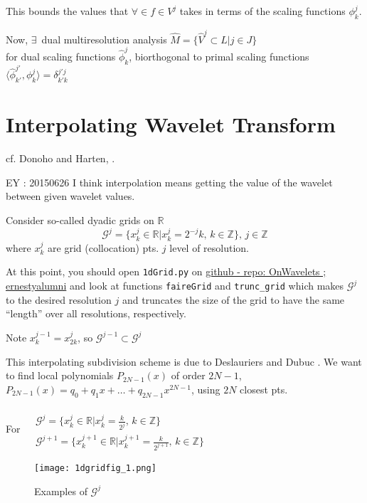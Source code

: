 \documentclass[twoside]{amsart}
\theoremstyle{plain}
\theoremstyle{definition}
\theoremstyle{remark}
\numberwithin{equation}{section}
\begin{document}
This bounds the values that $\forall \in f \in V^j$ takes in terms of the scaling functions $\phi_k^j$.  


Now, $\exists \, $ dual multiresolution analysis $\widehat{M} = \lbrace \widehat{V}^j \subset L | j \in J \rbrace$ \\
\phantom{ dual } for dual scaling functions $\widehat{\phi}^j_k$, biorthogonal to primal scaling functions $\langle \widehat{\phi}_{k'}^{j'} , \phi_k^j \rangle = \delta^{j'j}_{k'k}$  

\section{Interpolating Wavelet Transform}

cf. Donoho and Harten\cite{DDonoho1992}, \cite{AHarten1994}.  

EY : 20150626 I think interpolation means getting the value of the wavelet between given wavelet values.  

Consider so-called dyadic grids on $\mathbb{R}$
\[
\mathcal{G}^j = \lbrace x^j_k \in \mathbb{R} | x^j_k = 2^{-j}k ,\, k \in \mathbb{Z} \rbrace , \, j \in \mathbb{Z}
\]
where $x^j_k$ are grid (collocation) pts. $j$ level of resolution.  

At this point, you should open \verb|1dGrid.py| on \href{https://github.com/ernestyalumni/OnWavelets}{github - repo: OnWavelets ; ernestyalumni} and look at functions \verb|faireGrid| and \verb|trunc_grid| which makes $\mathcal{G}^j$ to the desired resolution $j$ and truncates the size of the grid to have the same ``length'' over all resolutions, respectively.   

Note $x_k^{j-1} = x^j_{2k}$, so $\mathcal{G}^{j-1} \subset \mathcal{G}^j$

This interpolating subdivision scheme is due to Deslauriers and Dubuc \cite{GDeslauriersSDubuc1989}.  
We want to find local polynomials $P_{2N-1}(x)$ of order $2N-1$, $P_{2N-1}(x) = q_0 + q_1 x + \dots + q_{2N-1}x^{2N-1}$, using $2N$ closest pts.  

For $\begin{aligned} & \quad \\ 
  & \mathcal{G}^j = \lbrace x^j_k \in \mathbb{R} | x^j_k = \frac{k}{2^j}, \, k \in \mathbb{Z} \rbrace \\
  & \mathcal{G}^{j+1} = \lbrace x^{j+1}_k \in \mathbb{R} | x^{j+1}_k = \frac{k}{2^{j+1}}, \, k \in \mathbb{Z} \rbrace \end{aligned}$

\begin{figure}[h!] \label{Fig:f(x)on2grids}
  \caption{Examples of $\mathcal{G}^j$ }
 \centering
   \texttt{[image: 1dgridfig\_1.png]}
\end{figure}
\end{document}
